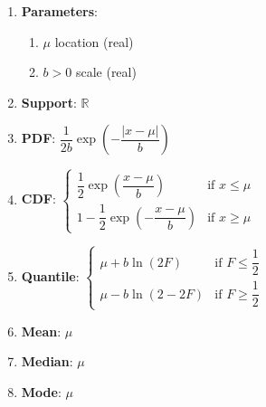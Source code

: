 \begin{enumerate}
    \item \textbf{Parameters}:
    \hfill \cite{wiki/Laplace_distribution}
    \begin{enumerate}
        \item ${\displaystyle \mu }$ location (real)
        \hfill \cite{wiki/Laplace_distribution}
        
        \item ${\displaystyle b>0}$ scale (real)
        \hfill \cite{wiki/Laplace_distribution}
    \end{enumerate}

    \item \textbf{Support}: $ {\displaystyle \mathbb {R} }$
    \hfill \cite{wiki/Laplace_distribution, statistics/book/Statistics-for-Data-Scientists/Maurits-Kaptein}

    \item \textbf{PDF}:
    $ {\displaystyle {\dfrac {1}{2b}}\exp \left(-{\dfrac {|x-\mu |}{b}}\right)}$
    \hfill \cite{wiki/Laplace_distribution, statistics/book/Statistics-for-Data-Scientists/Maurits-Kaptein}

    \item \textbf{CDF}: $ {\displaystyle {\begin{cases}{\dfrac {1}{2}}\exp \left({\dfrac {x-\mu }{b}}\right)&{\text{if }}x\leq \mu \\[8pt]1-{\dfrac {1}{2}}\exp \left(-{\dfrac {x-\mu }{b}}\right)&{\text{if }}x\geq \mu \end{cases}}}$
    \hfill \cite{wiki/Laplace_distribution}

    \item \textbf{Quantile}: $ {\displaystyle {\begin{cases}\mu +b\ln \left(2F\right)&{\text{if }}F\leq {\dfrac {1}{2}}\\[8pt]\mu -b\ln \left(2-2F\right)&{\text{if }}F\geq {\dfrac {1}{2}}\end{cases}}}$
    \hfill \cite{wiki/Laplace_distribution}

    \item \textbf{Mean}: $ {\displaystyle \mu }$
    \hfill \cite{wiki/Laplace_distribution}

    \item \textbf{Median}: $ {\displaystyle \mu }$
    \hfill \cite{wiki/Laplace_distribution}

    \item \textbf{Mode}: $ {\displaystyle \mu }$
    \hfill \cite{wiki/Laplace_distribution}


\end{enumerate}
